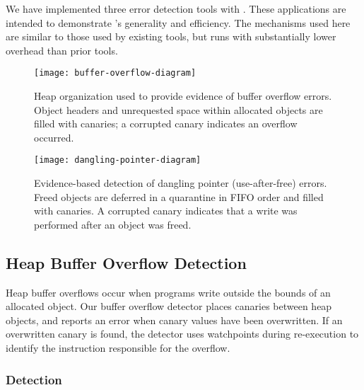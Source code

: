 \label{sec:applications}

We have implemented three error detection tools with \doubletake{}. These applications are intended to demonstrate \doubletake{}'s generality and efficiency. The mechanisms used here are similar to those used by existing tools, but \doubletake{} runs with substantially lower overhead than prior tools.

\begin{figure}[!t]
\begin{center}
\texttt{[image: buffer-overflow-diagram]}
\end{center}
\caption{Heap organization used to provide evidence of buffer overflow errors. Object headers and unrequested space within allocated objects are filled with canaries; a corrupted canary indicates an overflow occurred.
\label{fig:buffer-overflow}}
\end{figure}

\begin{figure}[!t]
\begin{center}
\texttt{[image: dangling-pointer-diagram]}
\end{center}
\caption{Evidence-based detection of dangling pointer (use-after-free) errors. Freed objects are deferred in a quarantine in FIFO order and filled with canaries. A corrupted canary indicates that a write was performed after an object was freed. 
\label{fig:dangling-pointer}}
\end{figure}

\subsection{Heap Buffer Overflow Detection}
\label{sec:applications/overflow}
Heap buffer overflows occur when programs write outside the bounds of an allocated object. Our buffer overflow detector places canaries between heap objects, and reports an error when canary values have been overwritten. If an overwritten canary is found, the detector uses watchpoints during re-execution to identify the instruction responsible for the overflow.

\subsubsection*{Detection}

